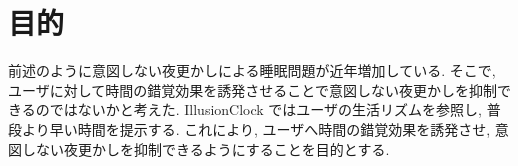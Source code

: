 \section{目的}
前述のように意図しない夜更かしによる睡眠問題が近年増加している.
そこで, ユーザに対して時間の錯覚効果を誘発させることで意図しない夜更かしを抑制できるのではないかと考えた.
 IllusionClock ではユーザの生活リズムを参照し, 普段より早い時間を提示する.
これにより, ユーザへ時間の錯覚効果を誘発させ, 意図しない夜更かしを抑制できるようにすることを目的とする.
